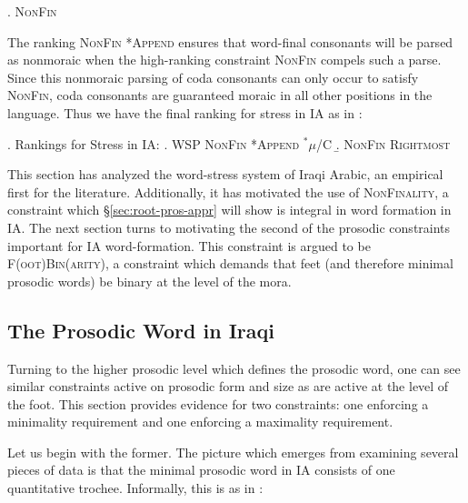 \documentclass[12pt,twoside,letterpaper]{article}
\begin{document}
\ex. \textsc{NonFin} \\\begin{OTtableau}{4}
\end{OTtableau}

The ranking \textsc{NonFin} \OTdom \textsc{*Append} ensures that word-final consonants will be parsed as nonmoraic when the high-ranking constraint \textsc{NonFin} compels such a parse. Since this nonmoraic parsing of coda consonants can only occur to satisfy \textsc{NonFin}, coda consonants are guaranteed moraic in all other positions in the language. Thus we have the final ranking for stress in IA as in \Next:

\ex. Rankings for Stress in IA:
\a. \textsc{WSP} \OTdom \textsc{NonFin} \OTdom \textsc{*Append} \OTdom $^*\mu$/\textsc{C}
\b. \textsc{NonFin} \OTdom \textsc{Rightmost}

This section has analyzed the word-stress system of Iraqi Arabic, an empirical first for the literature. Additionally, it has motivated the use of \textsc{NonFinality}, a constraint which \S{\ref{sec:root-pros-appr}} will show is integral in word formation in IA. The next section turns to motivating the second of the prosodic constraints important for IA word-formation. This constraint is argued to be \textsc{F(oot)Bin(arity)}, a constraint which demands that feet (and therefore minimal prosodic words) be binary at the level of the mora.


\subsection{The Prosodic Word in Iraqi}
\label{sec:prosodic-word-iraqi}

Turning to the higher prosodic level which defines the prosodic word, one can see similar constraints active on prosodic form and size as are active at the level of the foot. This section provides evidence for two constraints: one enforcing a minimality requirement and one enforcing a maximality requirement.

Let us begin with the former. The picture which emerges from examining several pieces of data is that the minimal prosodic word in IA consists of one quantitative trochee. Informally, this is as in \Next:
\end{document}
